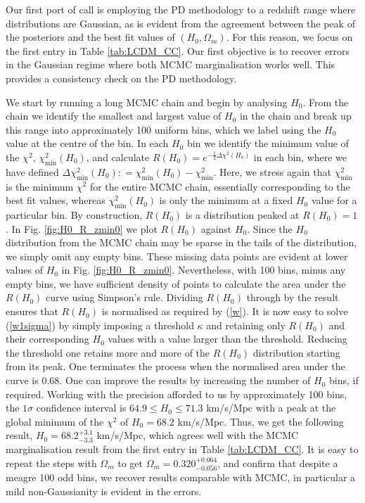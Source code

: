 \documentclass[aps,prl,10pt,twocolumn,superscriptaddress, nofootinbib]{revtex4}
\begin{document}
Our first port of call is employing the PD methodology to a redshift range where distributions are Gaussian, as is evident from the agreement between the peak of the posteriors and the best fit values of $(H_0, \Omega_m)$. For this reason, we focus on the first entry in Table \ref{tab:LCDM_CC}. Our first objective is to recover errors in the Gaussian regime where both MCMC marginalisation works well. This provides a consistency check on the PD methodology. 

We start by running a long MCMC chain and begin by analysing $H_0$. From the chain we identify the smallest and largest value of $H_0$ in the chain and break up this range into approximately 100 uniform bins, which we label using the $H_0$ value at the centre of the bin. In each $H_0$ bin we identify the minimum value of the $\chi^2$, $\chi^2_{\textrm{min}}(H_0)$, and calculate $R(H_0) = e^{-\frac{1}{2} \Delta \chi^2 (H_0)}$ in each bin, where we have defined $\Delta \chi_{\textrm{min}}^2 (H_0) : = \chi^2_{\textrm{min}}(H_0) - \chi^2_{\textrm{min}}$. Here, we stress again that $\chi^2_{\textrm{min}}$ is the minimum $\chi^2$ for the entire MCMC chain, essentially corresponding to the best fit values, whereas $\chi^2_{\textrm{min}} (H_0)$ is only the minimum at a fixed $H_0$ value for a particular bin. By construction, $R(H_0)$ is a distribution peaked at $R(H_0) = 1$. In Fig. \ref{fig:H0_R_zmin0} we plot $R(H_0)$ against $H_0$. Since the $H_0$ distribution from the MCMC chain may be sparse in the tails of the distribution, we simply omit any empty bins. These missing data points are evident at lower values of $H_0$ in Fig. \ref{fig:H0_R_zmin0}. Nevertheless, with 100 bins, minus any empty bins, we have sufficient density of points to calculate the area under the $R(H_0)$ curve using Simpson's rule. Dividing $R(H_0)$ through by the result ensures that $R(H_0)$ is normalised as required by (\ref{w}). It is now easy to solve (\ref{w1sigma}) by simply imposing a threshold $\kappa$ and retaining only $R(H_0)$ and their corresponding $H_0$ values with a value larger than the threshold. Reducing the threshold one retains more and more of the $R(H_0)$ distribution starting from its peak. One terminates the process when the normalised area under the curve is $0.68$. One can improve the results by increasing the number of $H_0$ bins, if required. Working with the precision afforded to us by approximately 100 bins, the $1 \sigma$ confidence interval is $64.9 \leq H_0 \leq 71.3$ km/s/Mpc with a peak at the global minimum of the $\chi^2$ of $H_0 = 68.2$ km/s/Mpc. Thus, we get the following result, $H_0 = 68.2^{+3.1}_{-3.3}$ km/s/Mpc, which agrees well with the MCMC marginalisation result from the first entry in Table \ref{tab:LCDM_CC}. It is easy to repeat the steps with $\Omega_m$ to get $\Omega_m = 0.320^{+0.064}_{-0.056}$, and confirm that despite a meagre 100 odd bins, we recover results comparable with MCMC, in particular a mild non-Gaussianity is evident in the errors.
\end{document}
